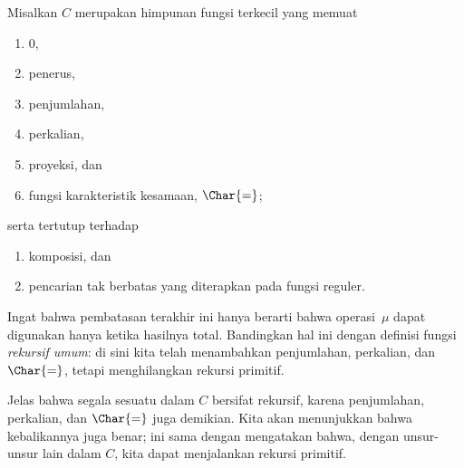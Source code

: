 \documentclass[../../../include/open-logic-section]{subfiles}
\begin{document}

Misalkan $C$ merupakan himpunan fungsi terkecil yang memuat
\begin{enumerate}
\item $0$,
\item penerus,
\item penjumlahan,
\item perkalian,
\item proyeksi, dan
\item fungsi karakteristik kesamaan, $\Char{=}$;
\end{enumerate}
serta tertutup terhadap
\begin{enumerate}
\item komposisi, dan
\item pencarian tak berbatas yang diterapkan pada fungsi reguler.
\end{enumerate}
Ingat bahwa pembatasan terakhir ini hanya berarti bahwa operasi~$\mu$ dapat
digunakan hanya ketika hasilnya total. Bandingkan hal ini dengan definisi
fungsi \emph{rekursif umum}: di sini kita telah menambahkan penjumlahan,
perkalian, dan $\Char{=}$, tetapi menghilangkan rekursi primitif.

Jelas bahwa segala sesuatu dalam $C$ bersifat rekursif, karena penjumlahan,
perkalian, dan $\Char{=}$ juga demikian. Kita akan menunjukkan bahwa
kebalikannya juga benar; ini sama dengan mengatakan bahwa, dengan unsur-unsur
lain dalam $C$, kita dapat menjalankan rekursi primitif.
\end{document}
